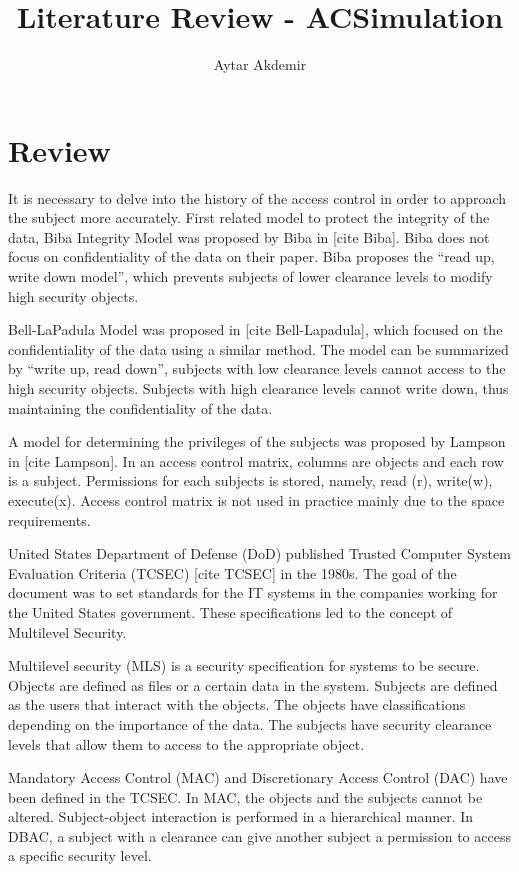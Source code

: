 \documentclass[11pt]{article} %
\title{Literature Review - ACSimulation}
\author{Aytar Akdemir}
\begin{document}
\maketitle

\section{Review}

It is necessary to delve into the history of the access control in order to approach the subject more accurately. 
First related model to protect the integrity of the data, Biba Integrity Model was proposed by Biba in [cite Biba]. 
Biba does not focus on confidentiality of the data on their paper. 
Biba proposes the ``read up, write down model'', which prevents subjects of lower clearance levels to modify high security objects.

Bell-LaPadula Model was proposed in [cite Bell-Lapadula], which focused on the confidentiality of the data using a similar method. 
The model can be summarized by ``write up, read down'', subjects with low clearance levels cannot access to the high security objects. 
Subjects with high clearance levels cannot write down, thus maintaining the confidentiality of the data.

A model for determining the privileges of the subjects was proposed by Lampson in [cite Lampson].
In an access control matrix, columns are objects and each row is a subject.
Permissions for each subjects is stored, namely, read (r), write(w), execute(x).
Access control matrix is not used in practice mainly due to the space requirements.

United States Department of Defense (DoD) published Trusted Computer System Evaluation Criteria (TCSEC) [cite TCSEC] in the 1980s. 
The goal of the document was to set standards for the IT systems in the companies working for the United States government. 
These specifications led to the concept of Multilevel Security. 

Multilevel security (MLS) is a security specification for systems to be secure. 
Objects are defined as files or a certain data in the system. 
Subjects are defined as the users that interact with the objects. 
The objects have classifications depending on the importance of the data. 
The subjects have security clearance levels that allow them to access to the appropriate object.

Mandatory Access Control (MAC) and Discretionary Access Control (DAC) have been defined in the TCSEC. 
In MAC, the objects and the subjects cannot be altered.
Subject-object interaction is performed in a hierarchical manner. 
In DBAC, a subject with a clearance can give another subject a permission to access a specific security level.
\end{document}
